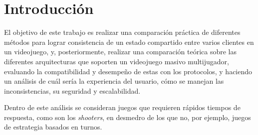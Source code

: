 \section{Introducción}


El objetivo de este trabajo es realizar una comparación práctica de diferentes métodos para lograr consistencia de un estado compartido entre varios clientes en un videojuego, y, posteriormente, realizar una comparación teórica sobre las diferentes arquitecturas que soporten un videojuego masivo multijugador, evaluando la compatibilidad y desempeño de estas con los protocolos, y haciendo un análisis de cuál sería la experiencia del usuario, cómo se manejan las inconsistencias, su seguridad y escalabilidad.

Dentro de este análisis se consideran juegos que requieren rápidos tiempos de respuesta, como son los \emph{shooters}, en desmedro de los que no, por ejemplo, juegos de estrategia basados en turnos.





